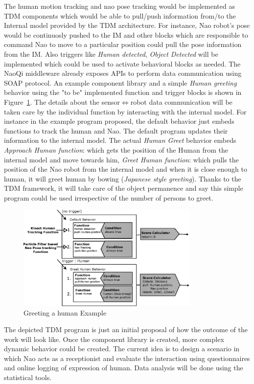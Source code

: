 The human motion tracking and nao pose tracking would be implemented as TDM components which would be able to pull/push information from/to the Internal model provided by the TDM architecture. For instance, Nao robot's pose would be continuosly pushed to the IM and other blocks which are responsible to command Nao to move to a particular position could pull the pose information from the IM. Also triggers like \emph{Human detected}, \emph{Object Detected} will be implemented which could be used to activate behavioral blocks as needed. The NaoQi middleware already exposes APIs to perform data communication using SOAP protocol. An example component library and a simple \emph{Human greeting} behavior using the "to be" implemented function and trigger blocks is shown in Figure~\ref{fig:program}. The details about the sensor$\Leftrightarrow$robot data communication will be taken care by the individual function by interacting with the internal model. For instance in the example program proposed, the default behavior just embeds functions to track the human and Nao. The default program updates their information to the internal model. The actual \emph{Human Greet} behavior embeds \emph{Approach Human function}: which gets the position of the Human from the internal model and move towards him, \emph{Greet Human function}: which pulls the position of the Nao robot from the internal model and when it is close enough to human, it will greet human by bowing (\emph{Japanese style greeting}). Thanks to the TDM framework, it will take care of the object permanence and say this simple program could be used irrespective of the number of persons to greet.
\begin{figure}
\centering
\includegraphics[width=0.8\textwidth]{assets/tdm_example_proposed.eps}
\caption{Greeting a human Example}
\label{fig:program}
\end{figure}	
	The depicted TDM program is just an initial proposal of how the outcome of the work will look like. Once the component library is created, more complex dynamic behavior could be created. The current idea is to design a scenario in which Nao acts as a receptionist and evaluate the interaction using questionnaires and online logging of expression of human. Data analysis will be done using the statistical tools.

